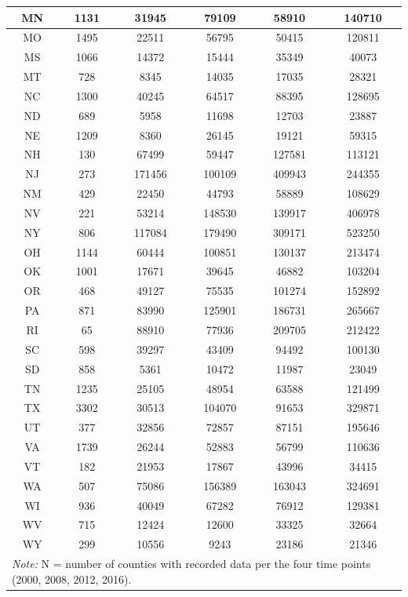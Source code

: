 \documentclass[
  english,
  man]{apa6}
\begin{document}
\begin{table}
\begin{tabular}[t]{c|c|c|c|c|c}
\hline
MN & 1131 & 31945 & 79109 & 58910 & 140710\\
\hline
MO & 1495 & 22511 & 56795 & 50415 & 120811\\
\hline
MS & 1066 & 14372 & 15444 & 35349 & 40073\\
\hline
MT & 728 & 8345 & 14035 & 17035 & 28321\\
\hline
NC & 1300 & 40245 & 64517 & 88395 & 128695\\
\hline
ND & 689 & 5958 & 11698 & 12703 & 23887\\
\hline
NE & 1209 & 8360 & 26145 & 19121 & 59315\\
\hline
NH & 130 & 67499 & 59447 & 127581 & 113121\\
\hline
NJ & 273 & 171456 & 100109 & 409943 & 244355\\
\hline
NM & 429 & 22450 & 44793 & 58889 & 108629\\
\hline
NV & 221 & 53214 & 148530 & 139917 & 406978\\
\hline
NY & 806 & 117084 & 179490 & 309171 & 523250\\
\hline
OH & 1144 & 60444 & 100851 & 130137 & 213474\\
\hline
OK & 1001 & 17671 & 39645 & 46882 & 103204\\
\hline
OR & 468 & 49127 & 75535 & 101274 & 152892\\
\hline
PA & 871 & 83990 & 125901 & 186731 & 265667\\
\hline
RI & 65 & 88910 & 77936 & 209705 & 212422\\
\hline
SC & 598 & 39297 & 43409 & 94492 & 100130\\
\hline
SD & 858 & 5361 & 10472 & 11987 & 23049\\
\hline
TN & 1235 & 25105 & 48954 & 63588 & 121499\\
\hline
TX & 3302 & 30513 & 104070 & 91653 & 329871\\
\hline
UT & 377 & 32856 & 72857 & 87151 & 195646\\
\hline
VA & 1739 & 26244 & 52883 & 56799 & 110636\\
\hline
VT & 182 & 21953 & 17867 & 43996 & 34415\\
\hline
WA & 507 & 75086 & 156389 & 163043 & 324691\\
\hline
WI & 936 & 40049 & 67282 & 76912 & 129381\\
\hline
WV & 715 & 12424 & 12600 & 33325 & 32664\\
\hline
WY & 299 & 10556 & 9243 & 23186 & 21346\\
\hline
\multicolumn{6}{l}{\rule{0pt}{1em}\textit{Note: } N = number of counties with recorded data per the four time points (2000, 2008, 2012, 2016).}\\
\end{tabular}
\end{table}
\end{document}

